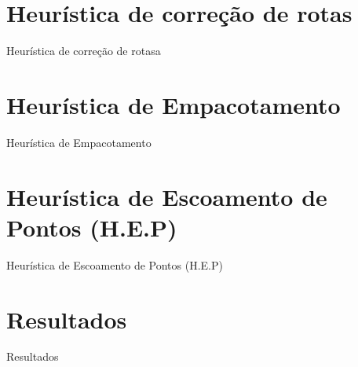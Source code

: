 \documentclass[12pt]{beamer}
\begin{document}
\section{Heur\'istica de corre\c{c}\~ao de rotas} %
	\begin{frame}{Heur\'istica de corre\c{c}\~ao de rotasa}
\end{frame}
\section{Heur\'istica de Empacotamento} %
	\begin{frame}{Heur\'istica de Empacotamento}
\end{frame}
\section{Heur\'istica de Escoamento de Pontos (H.E.P)} %
	\begin{frame}{Heur\'istica de Escoamento de Pontos (H.E.P)}
\end{frame}
\section{Resultados} %
	\begin{frame}{Resultados}
\end{frame}

	
	
	
	
\end{document}
